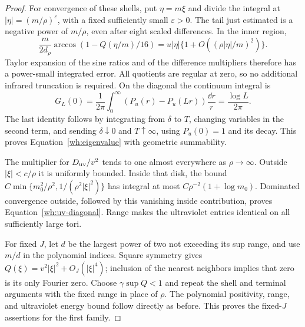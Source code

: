 \begin{proof}
For convergence of these shells, put $\eta=m\xi$ and divide the integral at
$|\eta|=(m/\rho)^\varepsilon$, with a fixed sufficiently small
$\varepsilon>0$.  The tail just estimated is a negative power of
$m/\rho$, even after eight scaled differences.  In the inner region,
\[
 \frac{m}{2d_\rho}\arccos(1-Q(\eta/m)/16)
 =u|\eta|\{1+O((\rho|\eta|/m)^2)\}.
\]
Taylor expansion of the sine ratios and of the difference multipliers
therefore has a power-small integrated error.  All quotients are regular
at zero, so no additional infrared truncation is required.  On the
diagonal the continuum integral is
\[
 G_L(0)=\frac1{2\pi}\int_0^\infty
       (P_u(r)-P_u(Lr))\frac{\dd r}{r}
       =\frac{\log L}{2\pi}.
\]
The last identity follows by integrating from $\delta$ to $T$, changing
variables in the second term, and sending $\delta\downarrow0$ and
$T\uparrow\infty$, using $P_u(0)=1$ and its decay.  This proves
Equation~\eqref{wh:eigenvalue} with geometric summability.

The multiplier for $D_{\rm uv}/v^2$ tends to one almost everywhere as
$\rho\to\infty$.  Outside $|\xi|<c/\rho$ it is uniformly bounded.
Inside that disk, the bound
$C\min\{m_0^2/\rho^2,1/(\rho^2|\xi|^2)\}$ has integral at most
$C\rho^{-2}(1+\log m_0)$.  Dominated convergence outside, followed by
this vanishing inside contribution, proves
Equation~\eqref{wh:uv-diagonal}.  Range makes the ultraviolet entries
identical on all sufficiently large tori.

For fixed $J$, let $d$ be the largest power of two not exceeding its
sup range, and use $m/d$ in the polynomial indices.  Square symmetry gives
$Q(\xi)=v^2|\xi|^2+O_J(|\xi|^4)$; inclusion of the nearest neighbors
implies that zero is its only Fourier zero.  Choose
$\gamma\sup Q<1$ and repeat the shell and terminal arguments with
the fixed range in place of $\rho$.  The polynomial positivity,
range, and ultraviolet energy bound follow directly as before.
This proves the fixed-$J$ assertions for the first family.


\end{proof}
